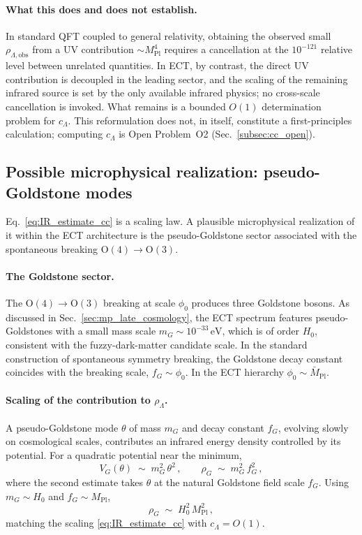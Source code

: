 \paragraph{What this does and does not establish.} In standard QFT
coupled to general relativity, obtaining the observed small
$\rho_{\Lambda,\mathrm{obs}}$ from a UV contribution
$\sim M_{\mathrm{Pl}}^4$ requires a cancellation at the $10^{-121}$
relative level between unrelated quantities. In ECT, by contrast, the
direct UV contribution is decoupled in the leading sector, and the
scaling of the remaining infrared source is set by the only available
infrared physics; no cross-scale cancellation is invoked. What remains
is a bounded $O(1)$ determination problem for $c_\Lambda$. This
reformulation does not, in itself, constitute a first-principles
calculation; computing $c_\Lambda$ is Open Problem~O2
(Sec.~\ref{subsec:cc_open}).


\subsection{Possible microphysical realization: pseudo-Goldstone modes}
\label{subsec:goldstone_cc}

Eq.~\eqref{eq:IR_estimate_cc} is a scaling law. A plausible
microphysical realization of it within the ECT architecture is the
pseudo-Goldstone sector associated with the spontaneous breaking
$\mathrm{O}(4)\to\mathrm{O}(3)$.

\paragraph{The Goldstone sector.} The
$\mathrm{O}(4)\to\mathrm{O}(3)$ breaking at scale $\phi_0$ produces
three Goldstone bosons. As discussed in
Sec.~\ref{sec:mp_late_cosmology}, the ECT spectrum features
pseudo-Goldstones with a small mass scale
$m_G \sim 10^{-33}\,\mathrm{eV}$, which is of order $H_0$, consistent
with the fuzzy-dark-matter candidate scale. In the standard
construction of spontaneous symmetry breaking, the Goldstone decay
constant coincides with the breaking scale, $f_G \sim \phi_0$. In the
ECT hierarchy $\phi_0 \sim \bar M_{\mathrm{Pl}}$.

\paragraph{Scaling of the contribution to $\rho_\Lambda$.} A
pseudo-Goldstone mode $\theta$ of mass $m_G$ and decay constant $f_G$,
evolving slowly on cosmological scales, contributes an infrared energy
density controlled by its potential. For a quadratic potential near
the minimum,
\begin{equation}
V_G(\theta) \;\sim\; m_G^2\, \theta^2\,,
\qquad
\rho_G \;\sim\; m_G^2\, f_G^2\,,
\label{eq:rho_G_cc}
\end{equation}
where the second estimate takes $\theta$ at the natural Goldstone
field scale $f_G$. Using $m_G \sim H_0$ and $f_G \sim M_{\mathrm{Pl}}$,
\begin{equation}
\rho_G \;\sim\; H_0^2\, M_{\mathrm{Pl}}^2\,,
\end{equation}
matching the scaling \eqref{eq:IR_estimate_cc} with
$c_\Lambda = O(1)$.

